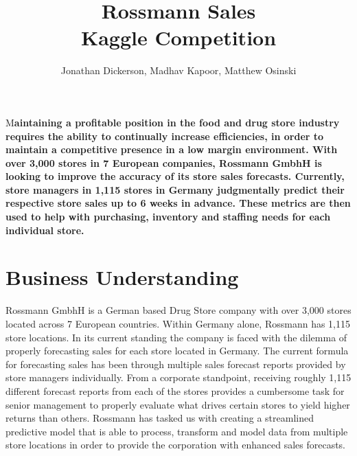 \documentclass[DIV=calc, paper=a4, fontsize=11pt]{scrartcl}	 %
\title{Rossmann Sales\\ Kaggle Competition} %
\author{Jonathan Dickerson, Madhav Kapoor, Matthew Osinski \\ } %
\date{} %
\newcommand{\initial}[1]{ %
\lettrine[lines=3,lhang=0.3,nindent=0em]{
\color{DarkGoldenrod}
{\textsf{#1}}}{}}
\begin{document}
\maketitle %

\thispagestyle{fancy} %


\initial{M}\textbf{aintaining a profitable position in the food and drug store industry requires the ability to continually increase efficiencies, in order to maintain a competitive presence in a low margin environment. With over 3,000 stores in 7 European companies, Rossmann GmbhH is looking to improve the accuracy of its store sales forecasts. Currently, store managers in 1,115 stores in Germany judgmentally predict their respective store sales up to 6 weeks in advance. These metrics are then used to help with purchasing, inventory and staffing needs for each individual store.\cite{RossmannKaggle}}

\doublespacing
\section*{Business Understanding}

Rossmann GmbhH is a German based Drug Store company with over 3,000 stores located 
across 7 European countries. Within Germany alone, Rossmann has 1,115 store locations. In its 
current standing the company is faced with the dilemma of properly forecasting sales for each 
store located in Germany. The current formula for forecasting sales has been through multiple 
sales forecast reports provided by store managers individually. From a corporate standpoint, 
receiving roughly 1,115 different forecast reports from each of the stores provides a 
cumbersome task for senior management to properly evaluate what drives certain stores to 
yield higher returns than others. Rossmann has tasked us with creating a streamlined predictive model that is able to process, transform and model data from multiple store locations in order to provide the corporation with enhanced sales forecasts. 
\end{document}
